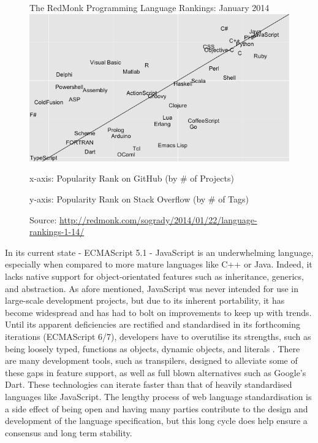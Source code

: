 \documentclass[final]{cmpreport}
\begin{document}

\begin{figure}[h!]{The RedMonk Programming Language Rankings: January 2014 \label{ranking}}
  \includegraphics[width=1.0\textwidth]{lang-rank-114-wm.png}
  \begin{tablenotes}
    \item x-axis: Popularity Rank on GitHub (by \# of Projects)
    \item y-axis: Popularity Rank on Stack Overflow (by \# of Tags)
    \item Source: \url{http://redmonk.com/sogrady/2014/01/22/language-rankings-1-14/}
  \end{tablenotes}
\end{figure}

 In its current state - ECMAScript 5.1 - JavaScript is an underwhelming language, especially when compared to more mature languages like C++ or Java. Indeed, it lacks native support for object-orientated features such as inheritance, generics, and abstraction. As afore mentioned, JavaScript was never intended for use in large-scale development projects, but due to its inherent portability, it has become widespread and has had to bolt on improvements to keep up with trends. Until its apparent deficiencies are rectified and standardised in its forthcoming iterations (ECMAScript 6/7), developers have to overutilise its strengths, such as being loosely typed, functions as objects, dynamic objects, and literals \citep{Julian}. There are many development tools, such as transpilers, designed to alleviate some of these gaps in feature support, as well as full blown alternatives such as Google's Dart. These technologies can iterate faster than that of heavily standardised languages like JavaScript. The lengthy process of web language standardisation is a side effect of being open and having many parties contribute to the design and development of the language specification, but this long cycle does help ensure a consensus and long term stability.
\end{document}
